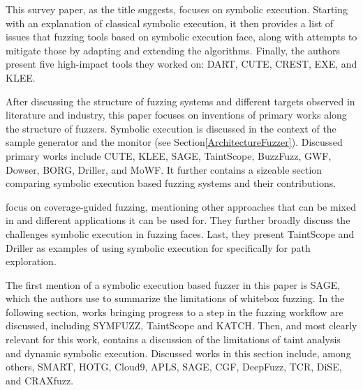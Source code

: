 \documentclass{article}
\begin{document}
\begin{multicols}{2}
    This survey paper, as the title suggests, focuses on symbolic execution. Starting with an explanation of classical symbolic execution, it then provides a list of issues that fuzzing tools based on symbolic execution face, along with attempts to mitigate those by adapting and extending the algorithms. Finally, the authors present five high-impact tools they worked on: DART\cite{DART}, CUTE\cite{CUTE}, CREST\cite{CREST}, EXE\cite{EXE}, and KLEE\cite{KLEE}.

    After discussing the structure of fuzzing systems and different targets observed in literature and industry, this paper focuses on inventions of primary works along the structure of fuzzers. Symbolic execution is discussed in the context of the sample generator and the monitor (see Section\ref{ArchitectureFuzzer}). Discussed primary works include CUTE\cite{CUTE}, KLEE\cite{KLEE}, SAGE\cite{SAGE}, TaintScope\cite{TaintScope}, BuzzFuzz\cite{BuzzFuzz}, GWF\cite{GWF}, Dowser\cite{Dowser}, BORG\cite{BORG}, Driller\cite{Driller}, and MoWF\cite{MoWF}. It further contains a sizeable section comparing symbolic execution based fuzzing systems and their contributions.

    \citeauthor{FuzzingASurvey} focus on coverage-guided fuzzing, mentioning other approaches that can be mixed in and different applications it can be used for. They further broadly discuss the challenges symbolic execution in fuzzing faces. Last, they present TaintScope\cite{TaintScope} and Driller\cite{Driller} as examples of using symbolic execution for specifically for path exploration.

    The first mention of a symbolic execution based fuzzer in this paper is SAGE\cite{SAGE}, which the authors use to summarize the limitations of whitebox fuzzing. In the following section, works bringing progress to a step in the fuzzing workflow are discussed, including SYMFUZZ\cite{SYMFUZZ}, TaintScope\cite{TaintScope} and KATCH\cite{KATCH}. Then, and most clearly relevant for this work,  contains a discussion of the limitations of taint analysis and dynamic symbolic execution. Discussed works in this section include, among others,  SMART\cite{SMART}, HOTG\cite{HigherOrderTestGeneration}, Cloud9\cite{Cloud9}, APLS\cite{APLS}, SAGE\cite{SAGE}, CGF\cite{CGF}, DeepFuzz\cite{DeepFuzz}, TCR\cite{TCR}, DiSE\cite{DiSE}, and CRAXfuzz\cite{CRAXfuzz}.


\end{multicols}
\end{document}

